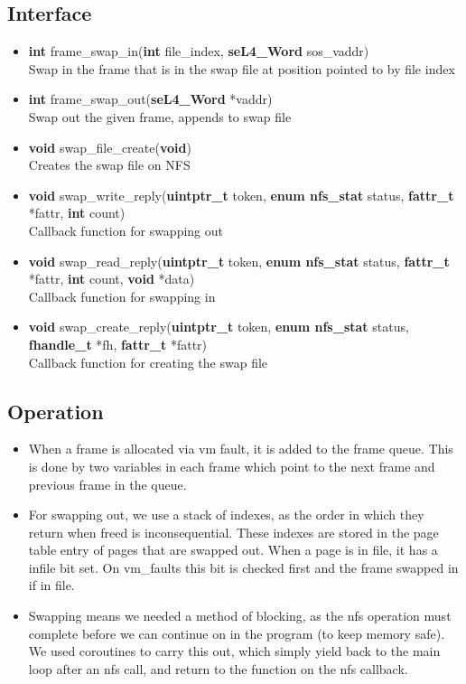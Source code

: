 \documentclass[12pt]{article}
\begin{document}
\subsection{Interface}
\begin{itemize}
\item \textbf{int} frame\_swap\_in(\textbf{int} file\_index, \textbf{seL4\_Word} sos\_vaddr)\\
Swap in the frame that is in the swap file at position pointed to by file index
\item \textbf{int} frame\_swap\_out(\textbf{seL4\_Word} *vaddr)\\
Swap out the given frame, appends to swap file
\item \textbf{void} swap\_file\_create(\textbf{void})\\
Creates the swap file on NFS
\item \textbf{void} swap\_write\_reply(\textbf{uintptr\_t} token, \textbf{enum nfs\_stat} status, \textbf{fattr\_t} *fattr, \textbf{int} count)\\
Callback function for swapping out
\item \textbf{void} swap\_read\_reply(\textbf{uintptr\_t} token, \textbf{enum nfs\_stat} status, \textbf{fattr\_t} *fattr, \textbf{int} count, \textbf{void} *data)\\
Callback function for swapping in
\item \textbf{void} swap\_create\_reply(\textbf{uintptr\_t} token, \textbf{enum nfs\_stat} status, \textbf{fhandle\_t} *fh, \textbf{fattr\_t} *fattr)\\
Callback function for creating the swap file
\end{itemize}
\subsection{Operation}
\begin{itemize}
\item When a frame is allocated via vm fault, it is added to the frame queue. This is
done by two variables in each frame which point to the next frame and previous
frame in the queue.

\item For swapping out, we use a stack of indexes, as the order in which they return
when freed is inconsequential. These indexes are stored in the page table entry
of pages that are swapped out. When a page is in file, it has a infile bit set. On vm\_faults this bit is checked first and the frame swapped in if in file.

\item Swapping means we needed a method of blocking, as the nfs operation must complete before we can continue on in the program (to keep memory safe).
We used coroutines to carry this out, which simply yield back to the main loop after an nfs call, and return to the function on the nfs callback.
\end{itemize}
\end{document}
